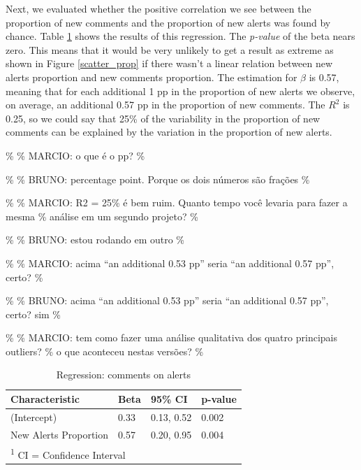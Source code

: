 \documentclass[
]{article}
\begin{document}
\normalsize

\small

\normalsize

Next, we evaluated whether the positive correlation we see between the
proportion of new comments and the proportion of new alerts was found by
chance. Table \ref{tab_reg} shows the results of this regression. The
\textit{p-value} of the beta nears zero. This means that it would be
very unlikely to get a result as extreme as shown in Figure
\ref{scatter_prop} if there wasn't a linear relation between new alerts
proportion and new comments proportion. The estimation for \(\beta\) is
0.57, meaning that for each additional 1 pp in the proportion of new
alerts we observe, on average, an additional 0.57 pp in the proportion
of new comments. The \(R^2\) is 0.25, so we could say that 25\% of the
variability in the proportion of new comments can be explained by the
variation in the proportion of new alerts.

\% \% MARCIO: o que é o pp? \%

\% \% BRUNO: percentage point. Porque os dois números são frações \%

\% \% MARCIO: R2 = 25\% é bem ruim. Quanto tempo você levaria para fazer
a mesma \% análise em um segundo projeto? \%

\% \% BRUNO: estou rodando em outro \%

\% \% MARCIO: acima ``an additional 0.53 pp'' seria ``an additional 0.57
pp'', certo? \%

\% \% BRUNO: acima ``an additional 0.53 pp'' seria ``an additional 0.57
pp'', certo? sim \%

\% \% MARCIO: tem como fazer uma análise qualitativa dos quatro
principais outliers? \% o que aconteceu nestas versões? \%

\small

\begin{table}

\caption{\label{tab:unnamed-chunk-28}\label{tab_reg} Regression: comments on alerts}
\centering
\begin{tabular}[t]{l|l|l|l}
\hline
Characteristic & Beta & 95\% CI & p-value\\
\hline
(Intercept) & 0.33 & 0.13, 0.52 & 0.002\\
\hline
New Alerts Proportion & 0.57 & 0.20, 0.95 & 0.004\\
\hline
\multicolumn{4}{l}{\textsuperscript{1} CI = Confidence Interval}\\
\end{tabular}
\end{table}
\end{document}
